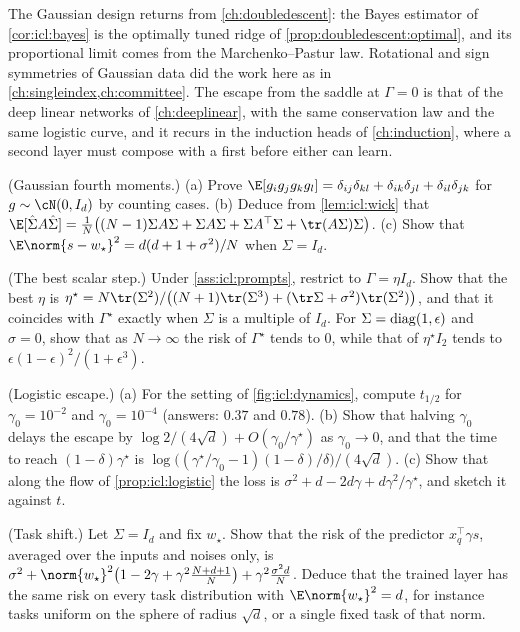 \begin{refsection}
The Gaussian design returns from \cref{ch:doubledescent}: the Bayes estimator of \cref{cor:icl:bayes} is the optimally tuned ridge of \cref{prop:doubledescent:optimal}, and its proportional limit comes from the Marchenko--Pastur law. Rotational and sign symmetries of Gaussian data did the work here as in \cref{ch:singleindex,ch:committee}. The escape from the saddle at $\Gamma=0$ is that of the deep linear networks of \cref{ch:deeplinear}, with the same conservation law and the same logistic curve, and it recurs in the induction heads of \cref{ch:induction}, where a second layer must compose with a first before either can learn.

\begin{exercises}
\item \consolidation (Gaussian fourth moments.) (a) Prove $\E[g_ig_jg_kg_l]=\delta_{ij}\delta_{kl}+\delta_{ik}\delta_{jl}+\delta_{il}\delta_{jk}$ for $g\sim\cN(0,I_d)$ by counting cases. (b) Deduce from \cref{lem:icl:wick} that $\E[\iclShat A\iclShat]=\frac1N\bigl((N-1)\Sigma A\Sigma+\Sigma A\Sigma+\Sigma A^\top\Sigma+\tr(A\Sigma)\Sigma\bigr)$. (c) Show that $\E\norm{s-w_\star}^2=d(d+1+\sigma^2)/N$ when $\Sigma=I_d$.\label{ex:icl:wick}

\item \consolidation (The best scalar step.) Under \cref{ass:icl:prompts}, restrict to $\Gamma=\eta I_d$. Show that the best $\eta$ is $\eta^\star=N\tr(\Sigma^2)/\bigl((N+1)\tr(\Sigma^3)+(\tr\Sigma+\sigma^2)\tr(\Sigma^2)\bigr)$, and that it coincides with $\Gamma^\star$ exactly when $\Sigma$ is a multiple of $I_d$. For $\Sigma=\operatorname{diag}(1,\epsilon)$ and $\sigma=0$, show that as $N\to\infty$ the risk of $\Gamma^\star$ tends to $0$, while that of $\eta^\star I_2$ tends to $\epsilon(1-\epsilon)^2/(1+\epsilon^3)$.\label{ex:icl:scalar}

\item \consolidation (Logistic escape.) (a) For the setting of \cref{fig:icl:dynamics}, compute $t_{1/2}$ for $\gamma_0=10^{-2}$ and $\gamma_0=10^{-4}$ (answers: $0.37$ and $0.78$). (b) Show that halving $\gamma_0$ delays the escape by $\log2/(4\sqrt d)+O(\gamma_0/\gamma^\star)$ as $\gamma_0\to0$, and that the time to reach $(1-\delta)\gamma^\star$ is $\log\bigl((\gamma^\star/\gamma_0-1)(1-\delta)/\delta\bigr)/(4\sqrt d)$. (c) Show that along the flow of \cref{prop:icl:logistic} the loss is $\sigma^2+d-2d\gamma+d\gamma^2/\gamma^\star$, and sketch it against $t$.\label{ex:icl:logistic}

\item \consolidation (Task shift.) Let $\Sigma=I_d$ and fix $w_\star$. Show that the risk of the predictor $x_q^\top\gamma s$, averaged over the inputs and noises only, is $\sigma^2+\norm{w_\star}^2\bigl(1-2\gamma+\gamma^2\frac{N+d+1}N\bigr)+\gamma^2\frac{\sigma^2d}N$. Deduce that the trained layer has the same risk on every task distribution with $\E\norm{w_\star}^2=d$, for instance tasks uniform on the sphere of radius $\sqrt d$, or a single fixed task of that norm.\label{ex:icl:taskshift}


\end{exercises}
\end{refsection}
